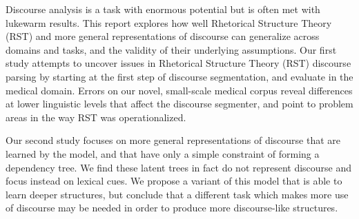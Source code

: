 Discourse analysis is a task with enormous potential but is often met with lukewarm results. This report explores how well Rhetorical Structure Theory (RST) and more general representations of discourse can generalize across domains and tasks, and the validity of their underlying assumptions. Our first study attempts to uncover issues in Rhetorical Structure Theory (RST) discourse parsing by starting at the first step of discourse segmentation, and evaluate in the medical domain. Errors on our novel, small-scale medical corpus reveal differences at lower linguistic levels that affect the discourse segmenter, and point to problem areas in the way RST was operationalized. 

Our second study focuses on more general representations of discourse that are learned by the model, and that have only a simple constraint of forming a dependency tree. We find these latent trees in fact do not represent discourse and focus instead on lexical cues. We propose a variant of this model that is able to learn deeper structures, but conclude that a different task which makes more use of discourse may be needed in order to produce more discourse-like structures.


